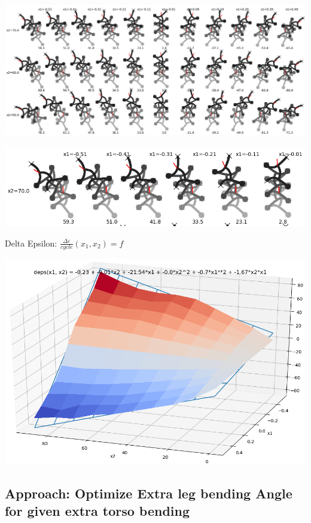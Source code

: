 \documentclass[10pt,a4paper]{article}
\begin{document}
\includegraphics[width=.95\textwidth]{../pics/model_2/GeckoBotGait_2cyc.png}

\includegraphics[width=.95\textwidth]{../pics/model_2/GeckoBotGait_2cyc_zoom.png}

Delta Epsilon: $\frac{\Delta \varepsilon}{cycle} (x_1, x_2) = f$

\includegraphics[width=.95\textwidth]{../pics/model_2/Delta_Epsilon_2cyc.png}



\subsection{Approach: Optimize Extra leg bending Angle for given extra torso bending}
\end{document}
